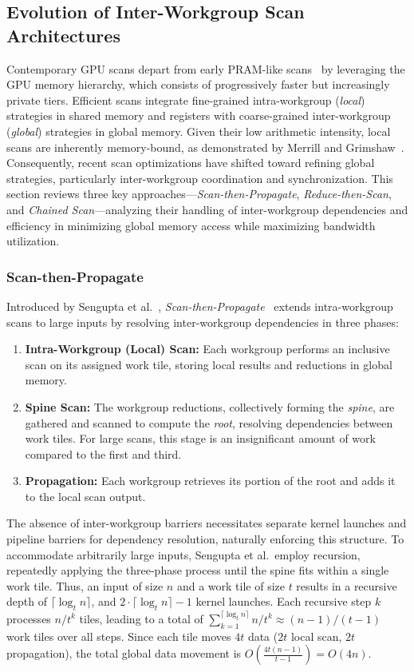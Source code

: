 \documentclass[acmsmall, manuscript, screen, review, anonymous]{acmart}
\begin{document}
\subsection{Evolution of Inter-Workgroup Scan Architectures}
Contemporary GPU scans depart from early PRAM-like scans~\cite{Horn, Hensley, Sengupta2006, Gress} by leveraging the GPU memory hierarchy, which consists of progressively faster but increasingly private tiers. Efficient scans integrate fine-grained intra-workgroup (\emph{local}) strategies in shared memory and registers with coarse-grained inter-workgroup (\emph{global}) strategies in global memory. Given their low arithmetic intensity, local scans are inherently memory-bound, as demonstrated by Merrill and Grimshaw~\cite{Merrill2009}. Consequently, recent scan optimizations have shifted toward refining global strategies, particularly inter-workgroup coordination and synchronization. This section reviews three key approaches---\emph{Scan-then-Propagate}, \emph{Reduce-then-Scan}, and \emph{Chained Scan}---analyzing their handling of inter-workgroup dependencies and efficiency in minimizing global memory access while maximizing bandwidth utilization.

\subsubsection{Scan-then-Propagate}
Introduced by Sengupta et al.~\cite{10.5555/1280094.1280110}, \emph{Scan-then-Propagate}~\cite{GPUGems3, Sengupta2011} extends intra-workgroup scans to large inputs by resolving inter-workgroup dependencies in three phases:
\begin{enumerate}
  \item \textbf{Intra-Workgroup (Local) Scan:}  Each workgroup performs an inclusive scan on its assigned work tile, storing local results and reductions in global memory.
  \item \textbf{Spine Scan:} The workgroup reductions, collectively forming the \emph{spine}, are gathered and scanned to compute the \emph{root}, resolving dependencies between work tiles. For large scans, this stage is an insignificant amount of work compared to the first and third.
  \item \textbf{Propagation:} Each workgroup retrieves its portion of the root and adds it to the local scan output.
\end{enumerate}
The absence of inter-workgroup barriers necessitates separate kernel launches and pipeline barriers for dependency resolution, naturally enforcing this structure. To accommodate arbitrarily large inputs, Sengupta et al.\ employ recursion, repeatedly applying the three-phase process until the spine fits within a single work tile. Thus, an input of size $n$ and a work tile of size $t$ results in a recursive depth of $\lceil \log_t n \rceil$, and $2\cdot\lceil \log_t n \rceil - 1$ kernel launches. Each recursive step $k$ processes $n/t^k$ tiles, leading to a total of $\sum_{k=1}^{\lceil \log_t n \rceil} n/t^k \approx (n - 1)/(t - 1)$ work tiles over all steps. Since each tile moves $4t$ data ($2t$ local scan, $2t$ propagation), the total global data movement is $O\left(\frac{4t(n - 1)}{t - 1}\right) = O(4n)$.
\end{document}
